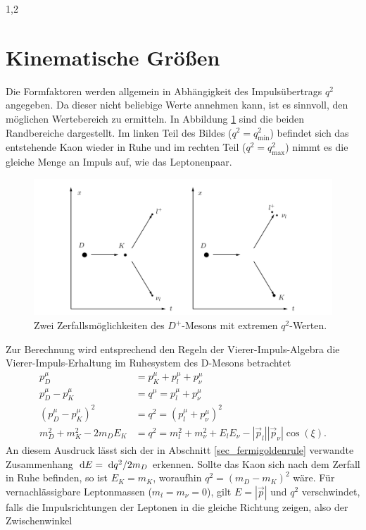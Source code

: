 \documentclass[11pt,a4paper,twoside]{report}
\begin{document}
\begin{spacing}{1,2}
\section{Kinematische Größen}
Die Formfaktoren werden allgemein in Abhängigkeit des Impulsübertrags $q^2$ angegeben. Da dieser nicht beliebige Werte annehmen kann, ist es sinnvoll, den 
möglichen Wertebereich zu ermitteln.  In Abbildung \ref{pic_DZerfall} sind die beiden Randbereiche dargestellt. Im linken Teil des Bildes ($q^2=q^2_\text{min}$)
befindet sich das entstehende Kaon wieder in Ruhe und im rechten Teil ($q^2=q^2_\text{max}$) nimmt es die gleiche Menge an Impuls auf, wie das Leptonenpaar.
\begin{figure}[h]
\includegraphics[width=1\textwidth]{Abbildungen/DZerfall.png}
\caption{Zwei Zerfallsmöglichkeiten des $D^+$-Mesons  mit extremen $q^2$-Werten.}
\label{pic_DZerfall}
\end{figure}
\noindent
Zur Berechnung wird entsprechend den Regeln der Vierer-Impuls-Algebra die Vierer-Impuls-Erhaltung im Ruhesystem des D-Mesons betrachtet
\begin{align}
 p_D^\mu &= p_K^\mu + p_l^\mu + p_\nu^\mu \nonumber\\
 p_D^\mu - p_K^\mu &= q^\mu = p_l^\mu + p_\nu^\mu \nonumber\\
 \left(p_D^\mu-p_K^\mu\right)^2 &= q^2 =  (p_l^\mu + p_\nu^\mu )^2\nonumber\\
 m_D^2 + m_K^2 - 2m_DE_K &= q^2 = m_l^2 + m_\nu^2 + E_lE_\nu - |\vec p_l||\vec p_\nu|\cos(\xi).
\end{align}
An diesem Ausdruck lässt sich der in Abschnitt \ref{sec_fermigoldenrule} verwandte Zusammenhang $\; \mathrm{d} E = \; \mathrm{d} q^2/2m_D$ erkennen.
Sollte das Kaon sich nach dem Zerfall in Ruhe befinden, so ist $E_K = m_K$, woraufhin $q^2 = (m_D-m_K)^2$ wäre. Für vernachlässigbare Leptonmassen 
($m_l=m_\nu=0$), gilt $E=|\vec p|$ und $q^2$ verschwindet, falls die Impulsrichtungen der Leptonen in die gleiche Richtung zeigen, also der Zwischenwinkel

\end{spacing}
\end{document}
